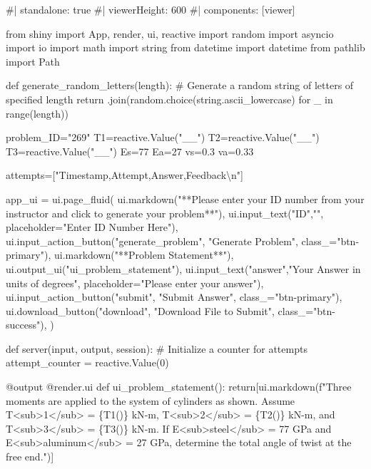 \documentclass[
  letterpaper,
  DIV=11,
  numbers=noendperiod]{scrreprt}
\newenvironment{Shaded}{\begin{snugshade}}{\end{snugshade}}
\newcommand{\NormalTok}[1]{\textcolor[rgb]{0.00,0.23,0.31}{#1}}
\begin{document}
\begin{Shaded}
\begin{Highlighting}[]
\NormalTok{\#| standalone: true}
\NormalTok{\#| viewerHeight: 600}
\NormalTok{\#| components: [viewer]}

\NormalTok{from shiny import App, render, ui, reactive}
\NormalTok{import random}
\NormalTok{import asyncio}
\NormalTok{import io}
\NormalTok{import math}
\NormalTok{import string}
\NormalTok{from datetime import datetime}
\NormalTok{from pathlib import Path}

\NormalTok{def generate\_random\_letters(length):}
\NormalTok{    \# Generate a random string of letters of specified length}
\NormalTok{    return \textquotesingle{}\textquotesingle{}.join(random.choice(string.ascii\_lowercase) for \_ in range(length)) }

\NormalTok{problem\_ID="269"}
\NormalTok{T1=reactive.Value("\_\_")}
\NormalTok{T2=reactive.Value("\_\_")}
\NormalTok{T3=reactive.Value("\_\_")}
\NormalTok{Es=77}
\NormalTok{Ea=27}
\NormalTok{vs=0.3}
\NormalTok{va=0.33}

\NormalTok{attempts=["Timestamp,Attempt,Answer,Feedback\textbackslash{}n"]}

\NormalTok{app\_ui = ui.page\_fluid(}
\NormalTok{    ui.markdown("**Please enter your ID number from your instructor and click to generate your problem**"),}
\NormalTok{    ui.input\_text("ID","", placeholder="Enter ID Number Here"),}
\NormalTok{    ui.input\_action\_button("generate\_problem", "Generate Problem", class\_="btn{-}primary"),}
\NormalTok{    ui.markdown("**Problem Statement**"),}
\NormalTok{    ui.output\_ui("ui\_problem\_statement"),}
\NormalTok{    ui.input\_text("answer","Your Answer in units of degrees", placeholder="Please enter your answer"),}
\NormalTok{    ui.input\_action\_button("submit", "Submit Answer", class\_="btn{-}primary"),}
\NormalTok{    ui.download\_button("download", "Download File to Submit", class\_="btn{-}success"),}
\NormalTok{)}


\NormalTok{def server(input, output, session):}
\NormalTok{    \# Initialize a counter for attempts}
\NormalTok{    attempt\_counter = reactive.Value(0)}

\NormalTok{    @output}
\NormalTok{    @render.ui}
\NormalTok{    def ui\_problem\_statement():}
\NormalTok{        return[ui.markdown(f"Three moments are applied to the system of cylinders as shown. Assume T\textless{}sub\textgreater{}1\textless{}/sub\textgreater{} = \{T1()\} kN{-}m, T\textless{}sub\textgreater{}2\textless{}/sub\textgreater{} = \{T2()\} kN{-}m, and T\textless{}sub\textgreater{}3\textless{}/sub\textgreater{} = \{T3()\} kN{-}m. If E\textless{}sub\textgreater{}steel\textless{}/sub\textgreater{} = 77 GPa and E\textless{}sub\textgreater{}aluminum\textless{}/sub\textgreater{} = 27 GPa, determine the total angle of twist at the free end.")]}
    

\end{Highlighting}
\end{Shaded}
\end{document}
